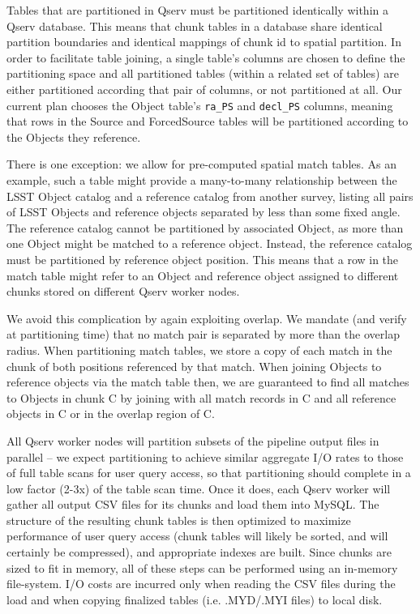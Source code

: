 \documentclass[DM,lsstdraft,toc]{lsstdoc}
\begin{document}
Tables that are partitioned in Qserv must be partitioned identically
within a Qserv database. This means that chunk tables in a database
share identical partition boundaries and identical mappings of chunk id
to spatial partition. In order to facilitate table joining, a single
table's columns are chosen to define the partitioning space and all
partitioned tables (within a related set of tables) are either
partitioned according that pair of columns, or not partitioned at all.
Our current plan chooses the Object table's \texttt{ra\_PS} and
\texttt{decl\_PS} columns, meaning that rows in the Source and
ForcedSource tables will be partitioned according to the Objects they
reference.

There is one exception: we allow for pre-computed spatial match tables.
As an example, such a table might provide a many-to-many relationship
between the LSST Object catalog and a reference catalog from another
survey, listing all pairs of LSST Objects and reference objects
separated by less than some fixed angle. The reference catalog cannot be
partitioned by associated Object, as more than one Object might be
matched to a reference object. Instead, the reference catalog must be
partitioned by reference object position. This means that a row in the
match table might refer to an Object and reference object assigned to
different chunks stored on different Qserv worker nodes.

We avoid this complication by again exploiting overlap. We mandate (and
verify at partitioning time) that no match pair is separated by more
than the overlap radius. When partitioning match tables, we store a copy
of each match in the chunk of both positions referenced by that match.
When joining Objects to reference objects via the match table then, we
are guaranteed to find all matches to Objects in chunk C by joining with
all match records in C and all reference objects in C or in the overlap
region of C.

All Qserv worker nodes will partition subsets of the pipeline output
files in parallel -- we expect partitioning to achieve similar aggregate
I/O rates to those of full table scans for user query access, so that
partitioning should complete in a low factor (2-3x) of the table scan
time. Once it does, each Qserv worker will gather all output CSV files
for its chunks and load them into MySQL. The structure of the resulting
chunk tables is then optimized to maximize performance of user query
access (chunk tables will likely be sorted, and will certainly be
compressed), and appropriate indexes are built. Since chunks are sized
to fit in memory, all of these steps can be performed using an in-memory
file-system. I/O costs are incurred only when reading the CSV files
during the load and when copying finalized tables (i.e. .MYD/.MYI files)
to local disk.
\end{document}
